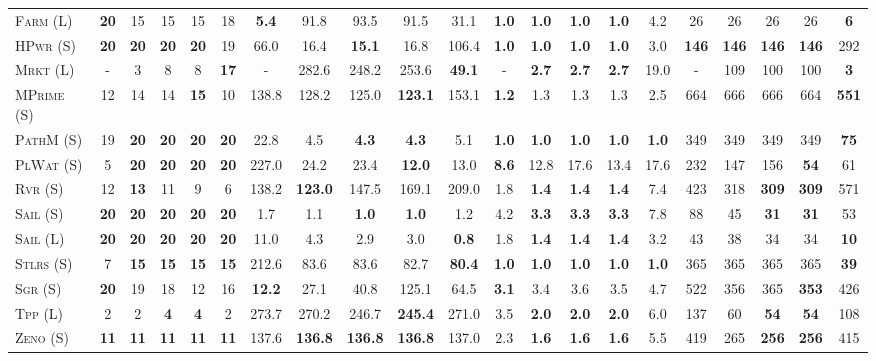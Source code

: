 \begin{table}[tb]
{\begin{tabular}{|l||ccccc||ccccc||ccccc||ccccc||}
\textsc{Farm} (L)&\textbf{20}&15&15&15&18&\textbf{5.4}&91.8&93.5&91.5&31.1&\textbf{1.0}&\textbf{1.0}&\textbf{1.0}&\textbf{1.0}&4.2&26&26&26&26&\textbf{6}\\
\textsc{HPwr} (S)&\textbf{20}&\textbf{20}&\textbf{20}&\textbf{20}&19&66.0&16.4&\textbf{15.1}&16.8&106.4&\textbf{1.0}&\textbf{1.0}&\textbf{1.0}&\textbf{1.0}&3.0&\textbf{146}&\textbf{146}&\textbf{146}&\textbf{146}&292\\
\textsc{Mrkt} (L)&-&3&8&8&\textbf{17}&-&282.6&248.2&253.6&\textbf{49.1}&-&\textbf{2.7}&\textbf{2.7}&\textbf{2.7}&19.0&-&109&100&100&\textbf{3}\\
\textsc{MPrime} (S)&12&14&14&\textbf{15}&10&138.8&128.2&125.0&\textbf{123.1}&153.1&\textbf{1.2}&1.3&1.3&1.3&2.5&664&666&666&664&\textbf{551}\\
\textsc{PathM} (S)&19&\textbf{20}&\textbf{20}&\textbf{20}&\textbf{20}&22.8&4.5&\textbf{4.3}&\textbf{4.3}&5.1&\textbf{1.0}&\textbf{1.0}&\textbf{1.0}&\textbf{1.0}&\textbf{1.0}&349&349&349&349&\textbf{75}\\
\textsc{PlWat} (S)&5&\textbf{20}&\textbf{20}&\textbf{20}&\textbf{20}&227.0&24.2&23.4&\textbf{12.0}&13.0&\textbf{8.6}&12.8&17.6&13.4&17.6&232&147&156&\textbf{54}&61\\
\textsc{Rvr} (S)&12&\textbf{13}&11&9&6&138.2&\textbf{123.0}&147.5&169.1&209.0&1.8&\textbf{1.4}&\textbf{1.4}&\textbf{1.4}&7.4&423&318&\textbf{309}&\textbf{309}&571\\
\textsc{Sail} (S)&\textbf{20}&\textbf{20}&\textbf{20}&\textbf{20}&\textbf{20}&1.7&1.1&\textbf{1.0}&\textbf{1.0}&1.2&4.2&\textbf{3.3}&\textbf{3.3}&\textbf{3.3}&7.8&88&45&\textbf{31}&\textbf{31}&53\\
\textsc{Sail} (L)&\textbf{20}&\textbf{20}&\textbf{20}&\textbf{20}&\textbf{20}&11.0&4.3&2.9&3.0&\textbf{0.8}&1.8&\textbf{1.4}&\textbf{1.4}&\textbf{1.4}&3.2&43&38&34&34&\textbf{10}\\
\textsc{Stlrs} (S)&7&\textbf{15}&\textbf{15}&\textbf{15}&\textbf{15}&212.6&83.6&83.6&82.7&\textbf{80.4}&\textbf{1.0}&\textbf{1.0}&\textbf{1.0}&\textbf{1.0}&\textbf{1.0}&365&365&365&365&\textbf{39}\\
\textsc{Sgr} (S)&\textbf{20}&19&18&12&16&\textbf{12.2}&27.1&40.8&125.1&64.5&\textbf{3.1}&3.4&3.6&3.5&4.7&522&356&365&\textbf{353}&426\\
\textsc{Tpp} (L)&2&2&\textbf{4}&\textbf{4}&2&273.7&270.2&246.7&\textbf{245.4}&271.0&3.5&\textbf{2.0}&\textbf{2.0}&\textbf{2.0}&6.0&137&60&\textbf{54}&\textbf{54}&108\\
\textsc{Zeno} (S)&\textbf{11}&\textbf{11}&\textbf{11}&\textbf{11}&\textbf{11}&137.6&\textbf{136.8}&\textbf{136.8}&\textbf{136.8}&137.0&2.3&\textbf{1.6}&\textbf{1.6}&\textbf{1.6}&5.5&419&265&\textbf{256}&\textbf{256}&415\\

\end{tabular}}
\end{table}
